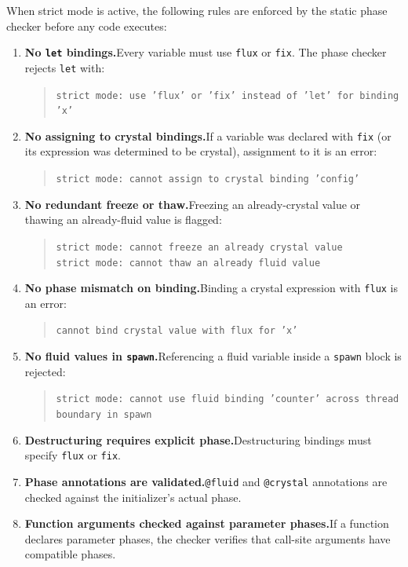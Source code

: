 When strict mode is active, the following rules are enforced by the static phase checker before any code executes:

\begin{enumerate}
  \item \textbf{No \texttt{let} bindings.}\quad Every variable must use \lstinline|flux| or \lstinline|fix|. The phase checker rejects \lstinline|let| with:
  \begin{quote}\small
    \texttt{strict mode: use 'flux' or 'fix' instead of 'let' for binding 'x'}
  \end{quote}

  \item \textbf{No assigning to crystal bindings.}\quad If a variable was declared with \lstinline|fix| (or its expression was determined to be crystal), assignment to it is an error:
  \begin{quote}\small
    \texttt{strict mode: cannot assign to crystal binding 'config'}
  \end{quote}

  \item \textbf{No redundant freeze or thaw.}\quad Freezing an already-crystal value or thawing an already-fluid value is flagged:
  \begin{quote}\small
    \texttt{strict mode: cannot freeze an already crystal value}\\
    \texttt{strict mode: cannot thaw an already fluid value}
  \end{quote}

  \item \textbf{No phase mismatch on binding.}\quad Binding a crystal expression with \lstinline|flux| is an error:
  \begin{quote}\small
    \texttt{cannot bind crystal value with flux for 'x'}
  \end{quote}

  \item \textbf{No fluid values in \texttt{spawn}.}\quad Referencing a fluid variable inside a \lstinline|spawn| block is rejected:
  \begin{quote}\small
    \texttt{strict mode: cannot use fluid binding 'counter' across thread boundary in spawn}
  \end{quote}

  \item \textbf{Destructuring requires explicit phase.}\quad Destructuring bindings must specify \lstinline|flux| or \lstinline|fix|.

  \item \textbf{Phase annotations are validated.}\quad \lstinline|@fluid| and \lstinline|@crystal| annotations are checked against the initializer's actual phase.

  \item \textbf{Function arguments checked against parameter phases.}\quad If a function declares parameter phases, the checker verifies that call-site arguments have compatible phases.
\end{enumerate}

